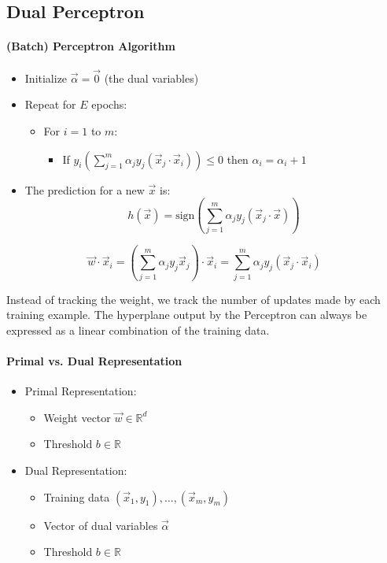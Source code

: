 \subsection{Dual Perceptron}

\paragraph{(Batch) Perceptron Algorithm}
\begin{itemize}
    \item Initialize $\vec{\alpha} = \vec{0}$ (the dual variables)
    \item Repeat for $E$ epochs:
    \begin{itemize}
        \item For $i = 1$ to $m$:
        \begin{itemize}
            \item If $y_i \left( \sum_{j=1}^m \alpha_j y_j (\vec{x}_j \cdot \vec{x}_i) \right) \leq 0$ then $\alpha_i = \alpha_i + 1$
        \end{itemize}
    \end{itemize}
    \item The prediction for a new $\vec{x}$ is:
    \[
        h(\vec{x}) = \text{sign} \left( \sum_{j=1}^m \alpha_j y_j (\vec{x}_j \cdot \vec{x}) \right)
    \]
\end{itemize}

\[
    \vec{w} \cdot \vec{x}_i = 
    \left( \sum_{j=1}^m \alpha_j y_j \vec{x}_j \right) \cdot \vec{x}_i = 
    \sum_{j=1}^m \alpha_j y_j (\vec{x}_j \cdot \vec{x}_i)
\]

Instead of tracking the weight, we track the number of updates made by each training example.
The hyperplane output by the Perceptron can always be expressed as a linear combination of the training data.

\paragraph{Primal vs. Dual Representation}

\begin{itemize}
    \item Primal Representation:
    \begin{itemize}
        \item Weight vector $\vec{w} \in \mathbb{R}^d$
        \item Threshold $b \in \mathbb{R}$
    \end{itemize}
    \item Dual Representation:
    \begin{itemize}
        \item Training data $(\vec{x}_1, y_1), \ldots, (\vec{x}_m, y_m)$
        \item Vector of dual variables $\vec{\alpha}$
        \item Threshold $b \in \mathbb{R}$
    \end{itemize}
\end{itemize}

